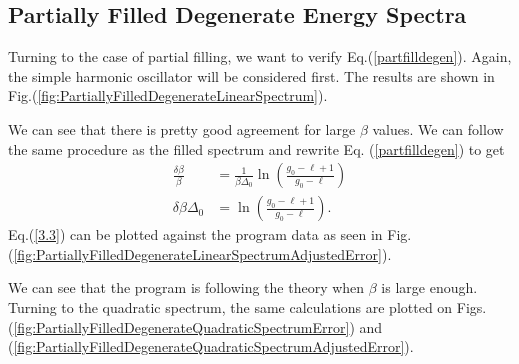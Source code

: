 \subsection{Partially Filled Degenerate Energy Spectra}
Turning to the case of partial filling, we want to verify Eq.\@ (\ref{partfilldegen}). Again, the simple harmonic oscillator will be considered first. The results are shown in Fig.\@ (\ref{fig:PartiallyFilledDegenerateLinearSpectrum}). 


We can see that there is pretty good agreement for large $\beta$ values. We can follow the same procedure as the filled spectrum and rewrite Eq. (\ref{partfilldegen}) to get
\begin{align}
    \frac{\delta\beta}{\beta}&=\frac{1}{\beta\Delta_0}\ln(\frac{g_0-\ell+1}{g_0-\ell})\nonumber\\
    \delta\beta \Delta_0&=\ln(\frac{g_0-\ell+1}{g_0-\ell}). \label{3.3}
\end{align}
Eq.\@ (\ref{3.3}) can be plotted against the program data as seen in Fig. (\ref{fig:PartiallyFilledDegenerateLinearSpectrumAdjustedError}). 

We can see that the program is following the theory when $\beta$ is large enough. Turning to the quadratic spectrum, the same calculations are plotted on Figs.\@ (\ref{fig:PartiallyFilledDegenerateQuadraticSpectrumError}) and (\ref{fig:PartiallyFilledDegenerateQuadraticSpectrumAdjustedError}). 

